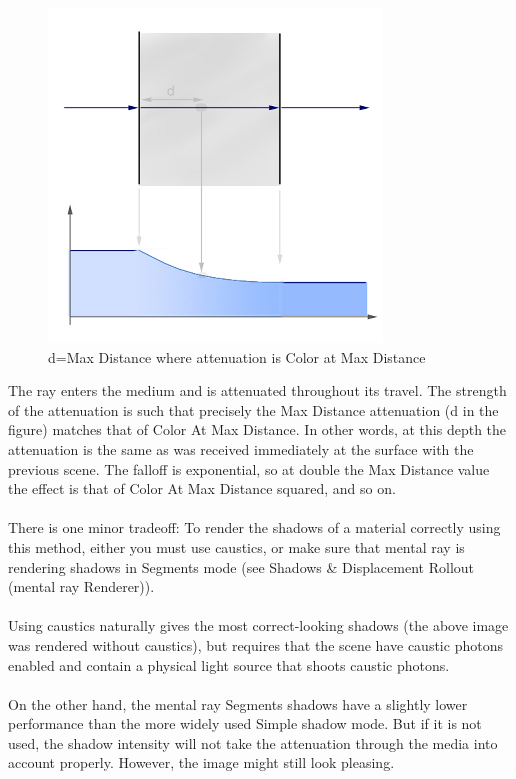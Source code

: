 \documentclass[10pt,a4paper]{article}
\begin{document}
\begin{figure}[tbh]
	\centering
	\includegraphics[width=0.5\linewidth]{"figure/d=Max Distance where attenuation is Color at Max Distance"}
	\caption{d=Max Distance where attenuation is Color at Max Distance}
	\label{fig:dmax-distance-where-attenuation-is-color-at-max-distance}
\end{figure}

The ray enters the medium and is attenuated throughout its travel. The strength of the attenuation is such that precisely the Max Distance attenuation (d in the figure) matches that of Color At Max Distance. In other words, at this depth the attenuation is the same as was received immediately at the surface with the previous scene. The falloff is exponential, so at double the Max Distance value the effect is that of Color At Max Distance squared, and so on.
\\
\\
There is one minor tradeoff: To render the shadows of a material correctly using this method, either you must use caustics, or make sure that mental ray is rendering shadows in Segments mode (see Shadows \& Displacement Rollout (mental ray Renderer)).
\\
\\
Using caustics naturally gives the most correct-looking shadows (the above image was rendered without caustics), but requires that the scene have caustic photons enabled and contain a physical light source that shoots caustic photons.
\\
\\
On the other hand, the mental ray Segments shadows have a slightly lower performance than the more widely used Simple shadow mode. But if it is not used, the shadow intensity will not take the attenuation through the media into account properly. However, the image might still look pleasing.
\end{document}
